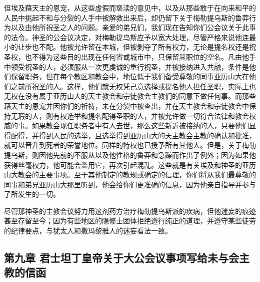 但埃及藉天主的恩宠，从这些虚假而亵渎的意见中，以及从那些敢于在向来和平的人民中挑起不和与分裂的人手中被解救出来后，却仍留下关于梅勒提乌斯的鲁莽行为以及由他所祝圣之人的问题。亲爱的弟兄们，我们现在告知你们公会议关于此事的法令。神圣的公会议决定，对梅勒提乌斯应予以宽大处理，尽管严格来说他连最小的让步也不配。他被允许留在本城，但被剥夺了所有权力，无论是提名权还是祝圣权，也不得为这些目的出现在任何省或城市中，只保留其职位的空名。凡由他手中领受祝圣的人，必须服从一次更虔诚的重行祝圣，并被接纳进入共融，条件是他们保留职务，但在每个教区和教会中，地位低于我们备受尊敬的同事亚历山大在他们之前所祝圣的人。这样，他们就无权凭己意选择或提名他人担任圣职，实际上也无权在没有属于亚历山大的天主教会和宗徒教会主教们的同意下做任何事。而那些藉天主的恩宠并因你们的祈祷，未在分裂中被查出，并在天主教会和宗徒教会中保持无瑕的人，则有权选举和提名配得圣职的人，并被允许做一切符合法律和教会权威的事。如果教会现任职务者中有人去世，那么这些新近被接纳的人，只要他们显得配得，并得到人民的选举，且选举得到亚历山大的天主教会主教的确认和批准，就可以晋升到死者的荣誉地位。同样的特权也已授予所有其他人。但是，关于梅勒提乌斯，则因他先前的不服从以及他性格的鲁莽和急躁而作出了例外；因为如果他获得丝毫权力，他可能会滥用它，再次引起混乱。这些就是有关埃及和神圣的亚历山大教会的主要事项。至于其他制定的教规或确定的信理，你们将从我们最尊敬的同事和弟兄亚历山大那里听到，他会给你们更准确的信息，因为他亲自指导并参与了所发生的一切。\par

\par

尽管那神圣的主教会议努力用这剂药方治疗梅勒提乌斯派的疾病，但他迷妄的痕迹甚至存留至今；因为有些地区的隐修士团体拒绝遵行纯正的道理，并遵守某些徒劳的纪律要点，与犹太人和撒玛黎雅人的迷妄看法一致。\par


\subsection{第九章 君士坦丁皇帝关于大公会议事项写给未与会主教的信函}

